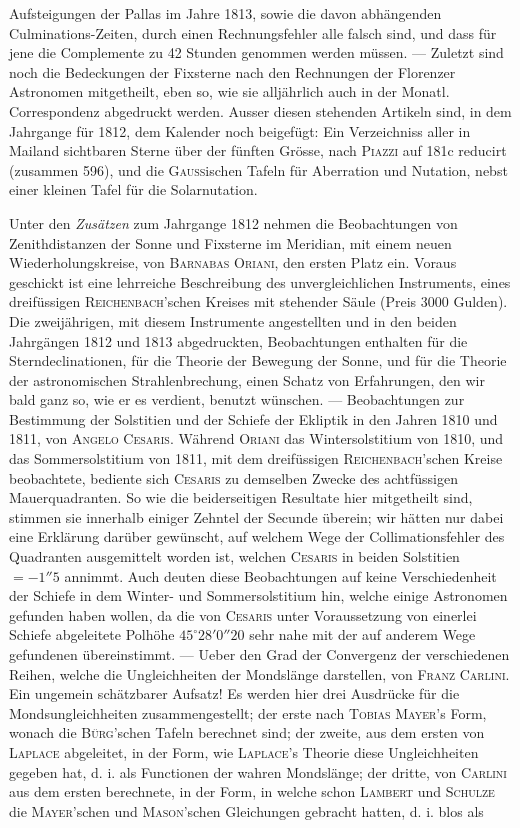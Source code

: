 Aufsteigungen der Pallas im Jahre 1813, sowie die davon abhängenden Culminations-Zeiten, durch einen Rechnungsfehler alle falsch sind, und dass für jene die Complemente zu 42 Stunden genommen werden müssen. --- Zuletzt sind noch die Bedeckungen der Fixsterne nach den Rechnungen der Florenzer Astronomen mitgetheilt, eben so, wie sie alljährlich auch in der Monatl. Correspondenz abgedruckt werden. Ausser diesen stehenden Artikeln sind, in dem Jahrgange für 1812, dem Kalender noch beigefügt: Ein Verzeichniss aller in Mailand sichtbaren Sterne über der fünften Grösse, nach \textsc{Piazzi} auf 181c reducirt (zusammen 596), und die \textsc{Gauss}ischen Tafeln für Aberration und Nutation, nebst einer kleinen Tafel für die Solarnutation.

Unter den \emph{Zusätzen} zum Jahrgange 1812 nehmen die Beobachtungen von Zenithdistanzen der Sonne und Fixsterne im Meridian, mit einem neuen Wiederholungskreise, von \textsc{Barnabas Oriani}, den ersten Platz ein. Voraus geschickt ist eine lehrreiche Beschreibung des unvergleichlichen Instruments, eines dreifüssigen \textsc{Reichenbach}'schen Kreises mit stehender Säule (Preis 3000 Gulden). Die zweijährigen, mit diesem Instrumente angestellten und in den beiden Jahrgängen 1812 und 1813 abgedruckten, Beobachtungen enthalten für die Sterndeclinationen, für die Theorie der Bewegung der Sonne, und für die Theorie der astronomischen Strahlenbrechung, einen Schatz von Erfahrungen, den wir bald ganz so, wie er es verdient, benutzt wünschen. --- Beobachtungen zur Bestimmung der Solstitien und der Schiefe der Ekliptik in den Jahren 1810 und 1811, von \textsc{Angelo Cesaris}. Während \textsc{Oriani} das Wintersolstitium von 1810, und das Sommersolstitium von 1811, mit dem dreifüssigen \textsc{Reichenbach}'schen Kreise beobachtete, bediente sich \textsc{Cesaris} zu demselben Zwecke des achtfüssigen Mauerquadranten. So wie die beiderseitigen Resultate hier mitgetheilt sind, stimmen sie innerhalb einiger Zehntel der Secunde überein; wir hätten nur dabei eine Erklärung darüber gewünscht, auf welchem Wege der Collimationsfehler des Quadranten ausgemittelt worden ist, welchen \textsc{Cesaris} in beiden Solstitien $= -1''5$ annimmt. Auch deuten diese Beobachtungen auf keine Verschiedenheit der Schiefe in dem Winter- und Sommersolstitium hin, welche einige Astronomen gefunden haben wollen, da die von \textsc{Cesaris} unter Voraussetzung von einerlei Schiefe abgeleitete Polhöhe $45^\circ 28' 0''20$ sehr nahe mit der auf anderem Wege gefundenen übereinstimmt. --- Ueber den Grad der Convergenz der verschiedenen Reihen, welche die Ungleichheiten der Mondslänge darstellen, von \textsc{Franz Carlini}. Ein ungemein schätzbarer Aufsatz! Es werden hier drei Ausdrücke für die Mondsungleichheiten zusammengestellt; der erste nach \textsc{Tobias Mayer}'s Form, wonach die \textsc{Bürg}'schen Tafeln berechnet sind; der zweite, aus dem ersten von \textsc{Laplace} abgeleitet, in der Form, wie \textsc{Laplace}'s Theorie diese Ungleichheiten gegeben hat, d. i. als Functionen der wahren Mondslänge; der dritte, von \textsc{Carlini} aus dem ersten berechnete, in der Form, in welche schon \textsc{Lambert} und \textsc{Schulze} die \textsc{Mayer}'schen und \textsc{Mason}'schen Gleichungen gebracht hatten, d. i. blos als 